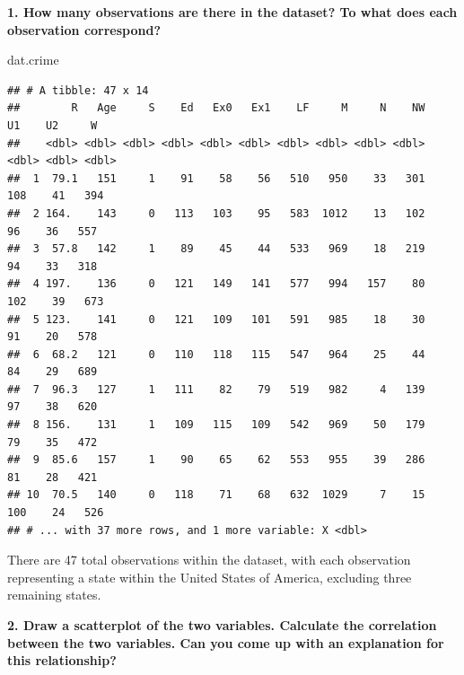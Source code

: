 \documentclass[
]{article}
\newenvironment{Shaded}{\begin{snugshade}}{\end{snugshade}}
\newcommand{\NormalTok}[1]{#1}
\begin{document}
\textbf{1. How many observations are there in the dataset? To what does
each observation correspond?}

\begin{Shaded}
\begin{Highlighting}[]
\NormalTok{dat.crime}
\end{Highlighting}
\end{Shaded}

\begin{verbatim}
## # A tibble: 47 x 14
##        R   Age     S    Ed   Ex0   Ex1    LF     M     N    NW    U1    U2     W
##    <dbl> <dbl> <dbl> <dbl> <dbl> <dbl> <dbl> <dbl> <dbl> <dbl> <dbl> <dbl> <dbl>
##  1  79.1   151     1    91    58    56   510   950    33   301   108    41   394
##  2 164.    143     0   113   103    95   583  1012    13   102    96    36   557
##  3  57.8   142     1    89    45    44   533   969    18   219    94    33   318
##  4 197.    136     0   121   149   141   577   994   157    80   102    39   673
##  5 123.    141     0   121   109   101   591   985    18    30    91    20   578
##  6  68.2   121     0   110   118   115   547   964    25    44    84    29   689
##  7  96.3   127     1   111    82    79   519   982     4   139    97    38   620
##  8 156.    131     1   109   115   109   542   969    50   179    79    35   472
##  9  85.6   157     1    90    65    62   553   955    39   286    81    28   421
## 10  70.5   140     0   118    71    68   632  1029     7    15   100    24   526
## # ... with 37 more rows, and 1 more variable: X <dbl>
\end{verbatim}

There are 47 total observations within the dataset, with each
observation representing a state within the United States of America,
excluding three remaining states.

\textbf{2. Draw a scatterplot of the two variables. Calculate the
correlation between the two variables. Can you come up with an
explanation for this relationship?}
\end{document}
